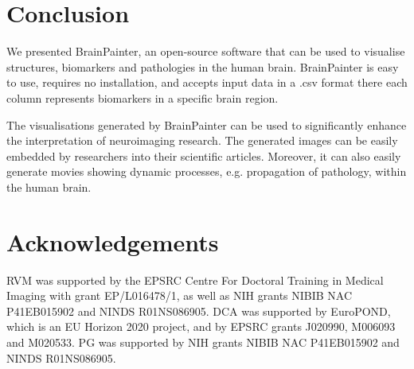 \documentclass{llncs}
\begin{document}
\section{Conclusion}

We presented BrainPainter, an open-source software that can be used to visualise structures, biomarkers and pathologies in the human brain. BrainPainter is easy to use, requires no installation, and accepts input data in a .csv format there each column represents biomarkers in a specific brain region. 

The visualisations generated by BrainPainter can be used to significantly enhance the interpretation of neuroimaging research. The generated images can be easily embedded by researchers into their scientific articles. Moreover, it can also easily generate movies showing dynamic processes, e.g. propagation of pathology, within the human brain. 



\FloatBarrier
\section{Acknowledgements}


RVM was supported by the EPSRC Centre For Doctoral Training in Medical Imaging with grant EP/L016478/1, as well as NIH grants NIBIB NAC P41EB015902 and NINDS R01NS086905. DCA was supported by EuroPOND, which is an EU Horizon 2020 project, and by EPSRC grants J020990, M006093 and M020533. PG was supported by NIH grants NIBIB NAC P41EB015902 and NINDS R01NS086905. 




\end{document}
